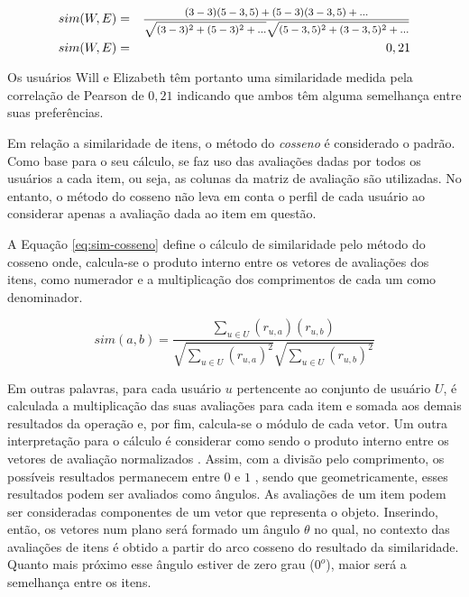         \begin{eqnarray}
            sim(W, E) &=& \text{\footnotesize   $\frac{(3-3)(5-3,5)+(5-3)(3-3,5)+...}{\sqrt{(3-3)^2+(5-3)^2+...}\sqrt{(5-3,5)^2+(3-3,5)^2+...}} $} \nonumber \\
            sim(W, E) &=& 0,21 \nonumber
        \end{eqnarray}
    
        Os usuários Will e Elizabeth têm portanto uma similaridade medida pela correlação de Pearson de $0,21$ indicando que ambos têm alguma semelhança entre suas preferências.
    
        Em relação a similaridade de itens, o método do \textit{cosseno} é considerado o padrão. Como base para o seu cálculo, se faz uso das avaliações dadas por todos os usuários a cada item, ou seja, as colunas da matriz de avaliação são utilizadas. No entanto, o método do cosseno não leva em conta o perfil de cada usuário ao considerar apenas a avaliação dada ao item em questão\cite{Jannach2010}.
        
        A Equação \ref{eq:sim-cosseno} define o cálculo de similaridade pelo método do cosseno onde, calcula-se o produto interno entre os vetores de avaliações dos itens, como numerador e a multiplicação dos comprimentos de cada um como denominador.         
        
        \begin{equation} 
            sim(a, b) = \frac{\sum_{u\in U}(r_{u, a})(r_{u, b})}{\sqrt{\sum_{u\in U}(r_{u, a})^2}\sqrt{\sum_{u\in U}(r_{u, b})^2}} \label{eq:sim-cosseno}
        \end{equation}    
    
        Em outras palavras, para cada usuário $u$ pertencente ao conjunto de usuário $U$, é calculada a multiplicação das suas avaliações para cada item e somada aos demais resultados da operação e, por fim, calcula-se o módulo de cada vetor. Um outra interpretação para o cálculo é considerar como sendo o produto interno entre os vetores de avaliação normalizados \cite{Jones1987}. Assim, com a divisão pelo comprimento, os possíveis resultados permanecem entre $0$ e $1$ \cite{Jannach2010}, sendo que geometricamente, esses resultados podem ser avaliados como ângulos. As avaliações de um item podem ser consideradas componentes de um vetor que representa o objeto. Inserindo, então, os vetores num plano será formado um ângulo $\theta$ no qual, no contexto das avaliações de itens é obtido a partir do arco cosseno do resultado da similaridade. Quanto mais próximo esse ângulo estiver de zero grau ($0^o$), maior será a semelhança entre os itens.
        
